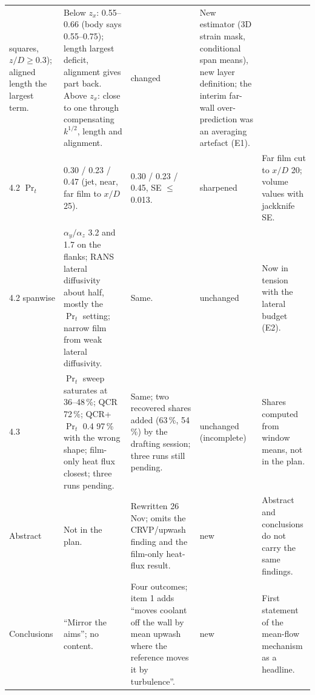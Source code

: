 \documentclass[10pt]{article}
\newcommand{\st}[1]{\textsf{\small #1}}
\begin{document}
{\begin{longtable}{@{}L{1.5cm} L{4.8cm} L{5.0cm} L{1.5cm} L{3.9cm}@{}}
squares, $z/D\ge0.3$); aligned length the largest term. & Below $z_x$: 0.55--0.66 (body says 0.55--0.75); length
largest deficit, alignment gives part back. Above $z_x$: close to one through compensating $k^{1/2}$, length and
alignment. & \st{changed} & New estimator (3D strain mask, conditional span means), new layer definition; the
interim far-wall over-prediction was an averaging artefact (E1). \\
4.2 $\Pr_t$ & 0.30 / 0.23 / 0.47 (jet, near, far film to $x/D$ 25). & 0.30 / 0.23 / 0.45, SE $\le$0.013. &
\st{sharpened} & Far film cut to $x/D$ 20; volume values with jackknife SE. \\
4.2 spanwise & $\alpha_y/\alpha_z$ 3.2 and 1.7 on the flanks; RANS lateral diffusivity about half, mostly the
$\Pr_t$ setting; narrow film from weak lateral diffusivity. & Same. & \st{unchanged} & Now in tension with the
lateral budget (E2). \\
4.3 & $\Pr_t$ sweep saturates at 36--48\,\%; QCR 72\,\%; QCR+$\Pr_t$ 0.4 97\,\% with the wrong shape; film-only
heat flux closest; three runs pending. & Same; two recovered shares added (63\,\%, 54\,\%) by the drafting
session; three runs still pending. & \st{unchanged} (incomplete) & Shares computed from window means, not in the
plan. \\
Abstract & Not in the plan. & Rewritten 26 Nov; omits the CRVP/upwash finding and the film-only heat-flux
result. & \st{new} & Abstract and conclusions do not carry the same findings. \\
Conclusions & ``Mirror the aims''; no content. & Four outcomes; item 1 adds ``moves coolant off the wall by mean
upwash where the reference moves it by turbulence''. & \st{new} & First statement of the mean-flow mechanism as a
headline. \\
\bottomrule
\end{longtable}}
\end{document}
